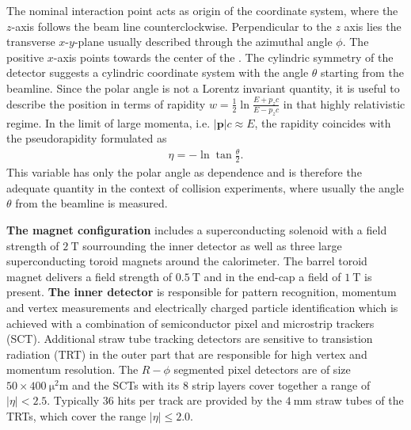%
The nominal interaction point acts as origin of the coordinate system, where the $z$-axis follows the beam line counterclockwise. Perpendicular to the $z$ axis lies the transverse $x$-$y$-plane usually described through the azimuthal angle $\phi$. The positive $x$-axis points towards the center of the {\LHC}. The cylindric symmetry of the detector suggests a cylindric coordinate system with the angle $\theta$ starting from the beamline. \cite{ATLASJINST} Since the polar angle is not a Lorentz invariant quantity, it is useful to describe the position in terms of rapidity \cite{LHCJINST} $w=\frac12\ln{\frac{E+p_zc}{E-p_zc}}$ in that highly relativistic regime. In the limit of large momenta, i.e. $|\mathbf{p}|c\approx E$, the rapidity coincides with the pseudorapidity formulated as \cite{ChinaPseudorapidityBook}
\begin{align}
                        \eta=-\ln{\tan\frac{\theta}{2}}\text{.}
\label{pseudorapidity}
\end{align}
This variable has only the polar angle as dependence and is therefore the adequate quantity in the context of collision experiments, where usually the angle $\theta$ from the beamline is measured. \cite{ChinaPseudorapidityBook}\par      
\textbf{The magnet configuration} includes a superconducting solenoid with a field strength of $\SI{2}{\tesla}$ sourrounding the inner detector as well as three large superconducting toroid magnets around the calorimeter. The barrel toroid magnet delivers a field strength of $\SI{0.5}{\tesla}$ and in the end-cap a field of $\SI{1}{\tesla}$ is present. \cite{ATLASJINST}\newline%
\textbf{The inner detector} is responsible for pattern recognition, momentum and vertex measurements and electrically charged particle identification which is achieved with a combination of semiconductor pixel and microstrip trackers (SCT). Additional straw tube tracking detectors are sensitive to transistion radiation (TRT) in the outer part that are responsible for high vertex and momentum resolution. The $R-\phi$ segmented pixel detectors are of size $50\times \SI{400}{\square\micro\meter}$ and the SCTs with its $8$ strip layers cover together a range of $|\eta|<2.5$. Typically $36$ hits per track are provided by the $\SI{4}{\milli\meter}$ straw tubes of the TRTs, which cover the range $|\eta|\leq 2.0$. \cite{ATLASJINST}\newline %
